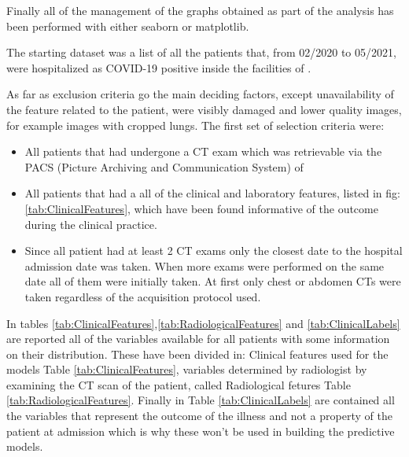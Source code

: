 Finally all of the management of the graphs obtained as part of the analysis has been performed with either seaborn\cite{seaborn} or matplotlib\cite{matplotlib}.


The starting dataset was a list of all the patients that, from 02/2020 to 05/2021, were hospitalized as COVID-19 positive inside the facilities of \orsola. 

As far as exclusion criteria go the main deciding factors, except unavailability of the feature related to the patient, were visibly damaged and lower quality images, for example images with cropped lungs. The first set of selection criteria were:

\begin{itemize}
\item All patients that had undergone a CT exam which was retrievable via the PACS (Picture Archiving and Communication System) of \orsola
\item All patients that had a all of the clinical and laboratory features, listed in fig:\ref{tab:ClinicalFeatures}, which have been found informative of the outcome during the clinical practice.
\item Since all patient had at least 2 CT exams only the closest date to the hospital admission date was taken. When more exams were performed on the same date all of them were initially taken. At first only chest or abdomen CTs were taken regardless of the acquisition protocol used.
\end{itemize}

In tables \ref{tab:ClinicalFeatures},\ref{tab:RadiologicalFeatures} and \ref{tab:ClinicalLabels} are reported all of the variables available for all patients with some information on their distribution.
These have been divided in: Clinical features used for the models Table \ref{tab:ClinicalFeatures}, variables determined by radiologist by examining the CT scan of the patient, called Radiological fetures Table \ref{tab:RadiologicalFeatures}.
Finally in Table \ref{tab:ClinicalLabels} are contained all the variables that represent the outcome of the illness and not a property of the patient at admission which is why these won't be used in building the predictive models.


